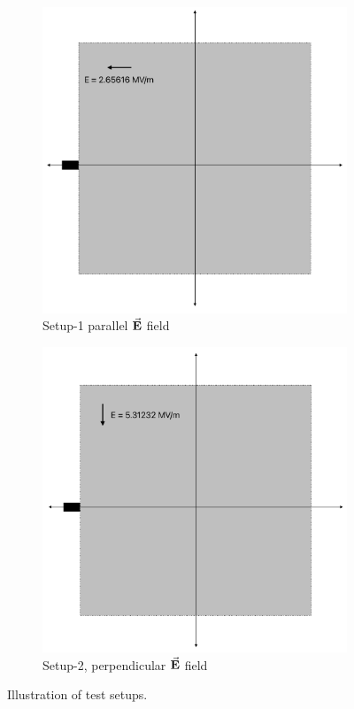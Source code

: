 \documentclass[a4paper,oneside,12pt]{report}
\numberwithin{equation}{chapter}
\begin{document}
\begin{figure}[H]
    \centering
    \begin{subfigure}{0.47\textwidth}
        \centering
        \includegraphics[width=0.9\linewidth]{./figures/illustrations/statE_1.png}
        \caption*{Setup-1 parallel $\vec{\textbf{E}}$ field}
    \end{subfigure}
    \begin{subfigure}{0.48\textwidth}
        \centering
        \includegraphics[width=0.9\linewidth]{./figures/illustrations/statE_2.png}
        \caption*{Setup-2, perpendicular $\vec{\textbf{E}}$ field}
    \end{subfigure}
    \caption{Illustration of test setups.}
\end{figure}
\end{document}

